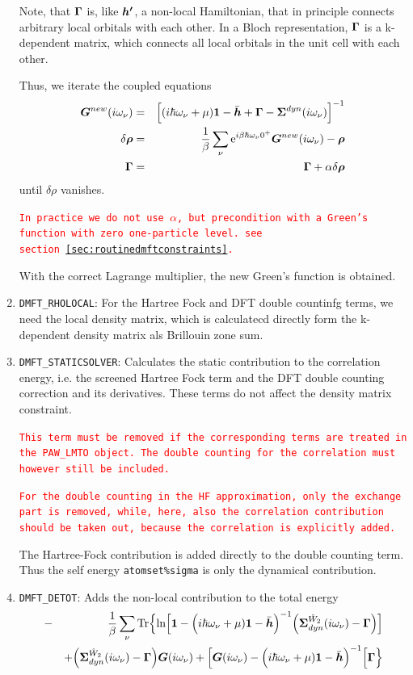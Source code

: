 \documentclass[11pt,a4paper]{report}
\newcommand{\petertt}[1]{\textcolor{red}{\texttt{#1}}}
\begin{document}
\begin{enumerate}
Note, that $\bm{\Gamma}$ is, like $\bm{h'}$, a non-local Hamiltonian,
that in principle connects arbitrary local orbitals with each
other. In a Bloch representation, $\bm{\Gamma}$ is a k-dependent matrix,
which connects all local orbitals in the unit cell with each other.

Thus, we iterate the coupled equations
\begin{eqnarray}
\bm{G}^{new}(i\omega_\nu)&=&\Bigl[(i\hbar\omega_\nu+\mu)\bm{1}
-\bar{\bm{h}}+\bm{\Gamma}
-\bm{\Sigma}^{dyn}(i\omega_\nu)
\Bigr]^{-1}
\nonumber\\
\delta\bm{\rho}&=&\frac{1}{\beta}\sum_\nu 
\mathrm{e}^{i\beta\hbar\omega_\nu0^+}\bm{G}^{new}(i\omega_\nu)-\bm{\rho}
\nonumber\\
\bm{\Gamma}&=&\bm{\Gamma}+\alpha \delta\bm{\rho}
\end{eqnarray}
until $\delta\rho$ vanishes.

\petertt{In practice we do not use $\alpha$, but precondition with a
  Green's function with zero one-particle level. see
  section~\ref{sec:routinedmftconstraints}.}

With the correct Lagrange multiplier, the new Green's function is
obtained.
%
\item \verb|DMFT_RHOLOCAL|: For the Hartree Fock and DFT double
  countinfg terms, we need the local density matrix, which is
  calculatecd directly form the k-dependent density matrix als
  Brillouin zone sum.
%
\item \verb|DMFT_STATICSOLVER|: Calculates the static contribution to
  the correlation energy, i.e. the screened Hartree Fock term and the
  DFT double counting correction and its derivatives. These terms do
  not affect the density matrix constraint.

   \petertt{This term must be removed if the corresponding terms are
     treated in the PAW\_LMTO object. The double counting for the
     correlation must however still be included.}

    \petertt{For the double counting in the HF approximation, only the
      exchange part is removed, while, here, also the correlation
      contribution should be taken out, because the correlation is
      explicitly added.}

    The Hartree-Fock contribution is added directly to the double
  counting term. Thus the self energy \verb|atomset%sigma| is only
  the dynamical contribution.
%
\item \verb|DMFT_DETOT|: Adds the non-local contribution to the total energy
\begin{eqnarray}
&-&\frac{1}{\beta}\sum_\nu\mathrm{Tr}\Bigl\lbrace
\ln\Bigl[
\bm{1}-
\Bigl(i\hbar\omega_\nu+\mu)\bm{1}-\bar{\bm{h}}\Bigr)^{-1}
\Bigl(
\bm{\Sigma}^{\hat{W}_2}_{dyn}(i\omega_\nu)-\bm{\Gamma}\Bigr)
\Bigr]
\nonumber\\&&
+\Bigl(\bm{\Sigma}^{\hat{W}_2}_{dyn}(i\omega_\nu)
-\bm{\Gamma}\Bigr)\bm{G}(i\omega_\nu)
+
\Bigl[
\bm{G}(i\omega_\nu)
-\Bigl(i\hbar\omega_\nu+\mu)\bm{1}-\bar{\bm{h}}\Bigr)^{-1}
\Bigr[
\bm{\Gamma}\Bigr\rbrace
\end{eqnarray}


\end{enumerate}
\end{document}
